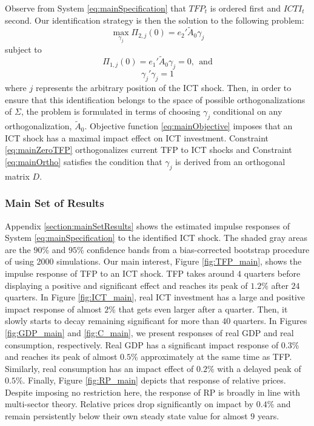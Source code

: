 \documentclass[12pt]{article}
\begin{document}
Observe from System \ref{eq:mainSpecification} that $TFP_t$ is ordered first and $ICTI_t$ second. Our identification strategy is then the solution to the following problem:
\begin{equation}\label{eq:mainObjective}
\max_{\gamma_j} \Pi_{2,j}(0) = e_2' \tilde{A}_0 \gamma_j
\end{equation}
subject to
\begin{equation}\label{eq:mainZeroTFP}
\Pi_{1,j}(0) = e_1' \tilde{A}_0 \gamma_j = 0, \ \ \text{and}
\end{equation}
\begin{equation}\label{eq:mainOrtho}
\gamma_j' \gamma_j = 1
\end{equation}
where $j$ represents the arbitrary position of the ICT shock. Then, in order to ensure that this identification belongs to the space of possible orthogonalizations of $\Sigma$, the problem is formulated in terms of choosing $\gamma_j$ conditional on any orthogonalization, $\tilde{A}_0$. Objective function \ref{eq:mainObjective} imposes that an ICT shock has a maximal impact effect on ICT investment. Constraint \ref{eq:mainZeroTFP} orthogonalizes current TFP to ICT shocks and Constraint \ref{eq:mainOrtho} satisfies the condition that $\gamma_j$ is derived from an orthogonal matrix $D$.  

\subsubsection{Main Set of Results}

Appendix \ref{section:mainSetResults} shows the estimated impulse responses of System \ref{eq:mainSpecification} to the identified ICT shock. The shaded gray areas are the $90$\% and $95$\% confidence bands from a bias-corrected bootstrap procedure of \cite{kilian1998small} using 2000 simulations. Our main interest, Figure \ref{fig:TFP_main}, shows the impulse response of TFP to an ICT shock. TFP takes around $4$ quarters before displaying a positive and significant effect and reaches its peak of $1.2$\% after $24$ quarters. In Figure \ref{fig:ICT_main}, real ICT investment has a large and positive impact response of almost $2$\% that gets even larger after a quarter. Then, it slowly starts to decay remaining significant for more than $40$ quarters. In Figures \ref{fig:GDP_main} and \ref{fig:C_main}, we present responses of real GDP and real consumption, respectively. Real GDP has a significant impact response of $0.3$\% and reaches its peak of almost $0.5$\% approximately at the same time as TFP. Similarly, real consumption has an impact effect of $0.2$\% with a delayed peak of $0.5$\%. Finally,  Figure \ref{fig:RP_main} depicts that response of relative prices. Despite imposing no restriction here, the response of RP is broadly in line with multi-sector theory. Relative prices drop significantly on impact by $0.4$\% and remain persistently below their own steady state value for almost $9$ years.
\end{document}
